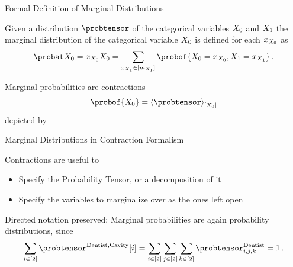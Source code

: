 \documentclass{beamer}
\begin{document}
    \begin{frame}{Formal Definition of Marginal Distributions}

        \begin{definition}\label{def:marginalProbability}
            Given a distribution $\probtensor$ of the categorical variables $X_{0}$ and $X_{1}$ the marginal distribution of the categorical variable $X_{0}$ is defined for each $x_{X_{0}}$ as
            \[
                \margprobof{\exrandom=\catindexof{\exrandom}}{\exrandom}
                = \sum_{\catindexof{\secexrandom}\in[\catdimof{\secexrandom}]} \probof{\exrandom=\catindexof{\exrandom},\secexrandom=\catindexof{\secexrandom}} \, . \]
        \end{definition}

        Marginal probabilities are contractions
        \begin{align*}
            \probof{\exrandom} = \contractionof{\probtensor}{\exrandom}
        \end{align*}
        depicted by
        \begin{center}
            
        \end{center}

    \end{frame}






    \begin{frame}{Marginal Distributions in Contraction Formalism}

        Contractions are useful to
        \begin{itemize}
            \item Specify the Probability Tensor, or a decomposition of it
            \item Specify the variables to marginalize over as the ones left open
        \end{itemize}

        \begin{center}
            
        \end{center}

        \medskip

        Directed notation preserved: Marginal probabilities are again probability distributions, since
        \begin{align}
            \sum_{i\in[2]}\probtensor^{\mathrm{Dentist},\mathrm{Cavity}}[i] = \sum_{i\in[2]} \sum_{j\in[2]} \sum_{k\in[2]} \probtensor^{\mathrm{Dentist}}_{i,j,k} = 1 \, .
        \end{align}


    \end{frame}
    
\end{document}
